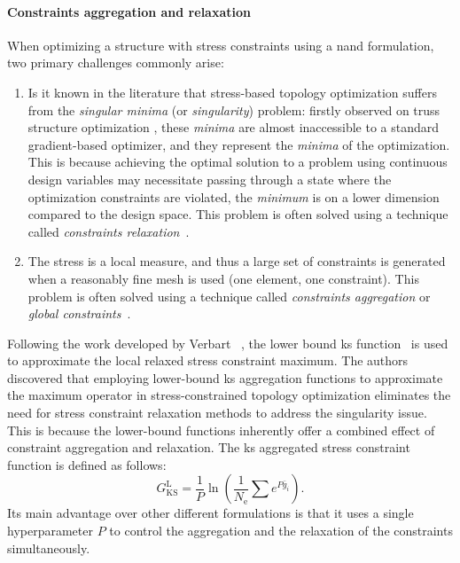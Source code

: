 \paragraph{Constraints aggregation and relaxation}
When optimizing a structure with stress constraints using a \gls{nand} formulation, two primary challenges commonly arise:
\begin{enumerate}[label=(\roman*)]
    \item Is it known in the literature \cite{rozvany_design-dependent_2001,stolpe_models_2003} that stress-based topology optimization suffers from the \textit{singular minima} (or \textit{singularity}) problem: firstly observed on truss structure optimization \cite{sved_structural_1968}, these \textit{minima} are almost inaccessible to a standard gradient-based optimizer, and they represent the \textit{minima} of the optimization. This is because achieving the optimal solution to a problem using continuous design variables may necessitate passing through a state where the optimization constraints are violated, \ie the \textit{minimum} is on a lower dimension compared to the design space. This problem is often solved using a technique called \textit{constraints relaxation}~.

    \item The stress is a local measure, and thus a large set of constraints is generated when a reasonably fine mesh is used (one element, one constraint). This problem is often solved using a technique called \textit{constraints aggregation} or \textit{global constraints}~.
\end{enumerate} 

Following the work developed by Verbart \etal~, the lower bound \gls{ks} function~ is used to approximate the local relaxed stress constraint maximum. The authors discovered that employing lower-bound \gls{ks} aggregation functions to approximate the maximum operator in stress-constrained topology optimization eliminates the need for stress constraint relaxation methods to address the singularity issue. This is because the lower-bound functions inherently offer a combined effect of constraint aggregation and relaxation. The \gls{ks} aggregated stress constraint function is defined as follows:
\begin{equation} 
    G_{\text{KS}}^\text{L} = \frac{1}{P} \ln{\left( \frac{1}{N_\text{e}} \sum e^{{P}\bar{g}_i} \right)}.
    \label{eq:03_gksl}
\end{equation}
Its main advantage over other different formulations is that it uses a single hyperparameter $P$ to control the aggregation and the relaxation of the constraints simultaneously.

